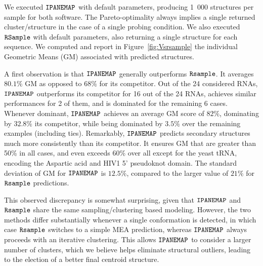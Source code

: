 \documentclass[a4,center,fleqn]{NAR}
\newcommand{\Software}[1]{$\text{\ttfamily #1}$}
\newcommand{\OurTool}{\Software{IPANEMAP}\xspace}
\newcommand{\Draft}[1]{{#1}}
\newcommand{\yp}[1]{\Draft{\todo[color=blue!30]{\sf Yann: #1}}}
\begin{document}
We executed \OurTool with default parameters, producing 1~000 structures per sample for both software. The Pareto-optimality always implies a single returned cluster/structure in the case of a single probing condition. 
We also executed \Software{RSample} with default parameters, also returning a single structure for each sequence. 
We computed and report in Figure~\ref{fig:Vsrsample} the individual Geometric Means (GM) associated with predicted structures.


A first observation is that \OurTool generally outperforms \Software{Rsample}. It averages $80.1\%$ GM as opposed to $68\%$ for its competitor.  Out of the 24 considered RNAs, \OurTool outperforms its competitor for 16 out of the 24 RNAs, achieves similar performances for 2 of them, and is dominated for the remaining 6 cases. Whenever dominant, \OurTool achieves an average GM score of $82\%$, dominating by $32.8\%$ its competitor, while being dominated by $3.5\%$ over the remaining examples (including ties). 
Remarkably, \OurTool predicts secondary structures much more consistently than its competitor. 
It ensures GM that are greater than 50\% in all cases, and even exceeds 60\% over all except for the yeast tRNA, encoding the Aspartic acid and HIV1 5' pseudoknot domain. The standard deviation of GM for \OurTool is $12.5\%$, compared to the larger value of $21\%$ for \Software{Rsample} predictions.

\yp{Reproducibility?}




This observed discrepancy is somewhat surprising, given that \OurTool and \Software{Rsample} share the same sampling/clustering based modeling. However, the two methods differ substantially whenever a single conformation is detected, in which case \Software{Rsample} switches to a simple MEA prediction, whereas \OurTool{} always proceeds with an iterative clustering. This allows \OurTool{} to consider a larger number of clusters, which we believe helps eliminate structural outliers, leading to the election of a better final centroid structure. 
\end{document}

